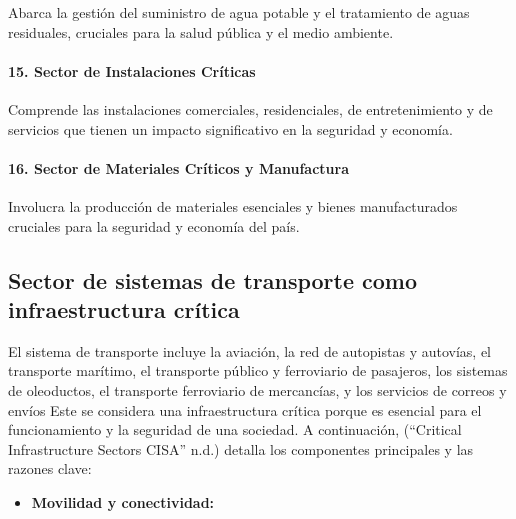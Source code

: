 \documentclass{article}
\providecommand{\tightlist}{%
  \setlength{\itemsep}{0pt}\setlength{\parskip}{0pt}}
\begin{document}
Abarca la gestión del suministro de agua potable y el tratamiento de
aguas residuales, cruciales para la salud pública y el medio ambiente.

\hypertarget{sector-de-instalaciones-cruxedticas}{%
\paragraph{\texorpdfstring{15. \textbf{Sector de Instalaciones
Críticas}}{15. Sector de Instalaciones Críticas}}\label{sector-de-instalaciones-cruxedticas}}

Comprende las instalaciones comerciales, residenciales, de
entretenimiento y de servicios que tienen un impacto significativo en la
seguridad y economía.

\hypertarget{sector-de-materiales-cruxedticos-y-manufactura}{%
\paragraph{\texorpdfstring{16. \textbf{Sector de Materiales Críticos y
Manufactura}}{16. Sector de Materiales Críticos y Manufactura}}\label{sector-de-materiales-cruxedticos-y-manufactura}}

Involucra la producción de materiales esenciales y bienes manufacturados
cruciales para la seguridad y economía del país.

\hypertarget{sector-de-sistemas-de-transporte-como-infraestructura-cruxedtica}{%
\subsection{Sector de sistemas de transporte como infraestructura
crítica}\label{sector-de-sistemas-de-transporte-como-infraestructura-cruxedtica}}

El sistema de transporte incluye la aviación, la red de autopistas y
autovías, el transporte marítimo, el transporte público y ferroviario de
pasajeros, los sistemas de oleoductos, el transporte ferroviario de
mercancías, y los servicios de correos y envíos Este se considera una
infraestructura crítica porque es esencial para el funcionamiento y la
seguridad de una sociedad. A continuación, ({``Critical {Infrastructure}
{Sectors} {\textbar} {CISA}''} n.d.) detalla los componentes principales
y las razones clave:

\begin{itemize}
\tightlist
\item
  \textbf{Movilidad y conectividad:}
\end{itemize}
\end{document}
